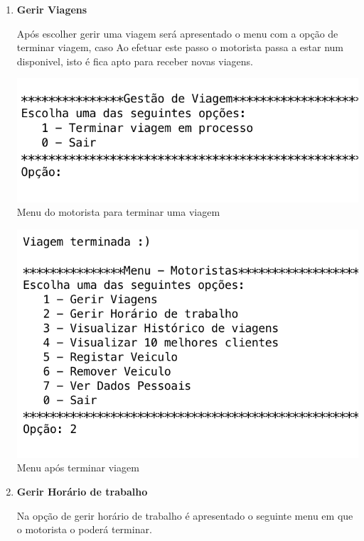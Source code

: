 \begin{enumerate}
	\item \textbf{Gerir Viagens}

Após escolher gerir uma viagem será apresentado o menu com a opção de terminar viagem, caso  Ao efetuar este passo o motorista passa a estar num disponivel, isto é fica apto para receber novas viagens. 

\hfill
\noindent\begin{minipage}[b]{.4\textwidth}
	\includegraphics[scale=0.55]{imagem/gerirViagem}
	\small{Menu do motorista para terminar uma viagem}
\end{minipage} 
\hfill
\begin{minipage}[b]{.4\textwidth}
	\includegraphics[scale=0.5]{imagem/viagemTerminada}
	\small{Menu após terminar viagem}
\end{minipage}
\hfill 

\item \textbf{Gerir Horário de trabalho}

Na opção de gerir horário de trabalho é apresentado o seguinte menu em que o motorista o poderá terminar. 


\end{enumerate}
